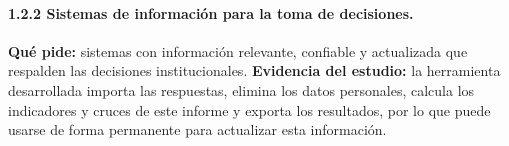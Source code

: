 \paragraph{1.2.2 Sistemas de información para la toma de decisiones.} \textbf{Qué pide:} sistemas con información relevante, confiable y actualizada que respalden las decisiones institucionales. \textbf{Evidencia del estudio:} la herramienta desarrollada importa las respuestas, elimina los datos personales, calcula los indicadores y cruces de este informe y exporta los resultados, por lo que puede usarse de forma permanente para actualizar esta información.

